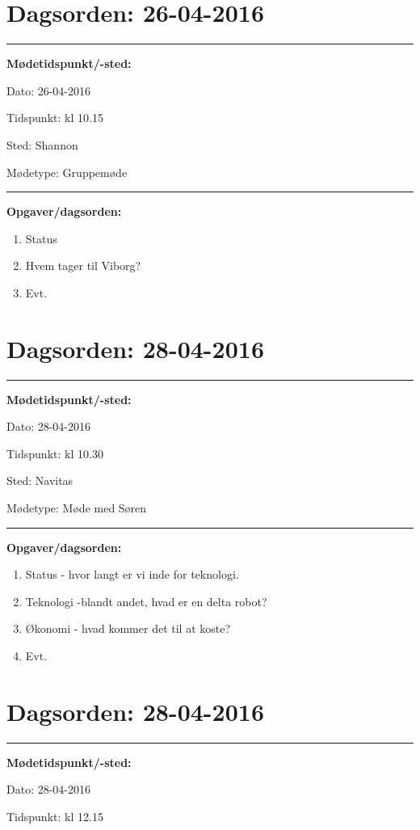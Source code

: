 \section{Dagsorden: 26-04-2016 }
\hrule
\textbf{Mødetidspunkt/-sted:} 

Dato: \tabto{7em} 26-04-2016

Tidspunkt: \tabto{7em} kl 10.15

Sted: \tabto{7em} Shannon 

Mødetype: \tabto{7em} Gruppemøde \newline


\hrule
\textbf{Opgaver/dagsorden:} \newline
\begin{enumerate}
	\item Status
	\item Hvem tager til Viborg? 
	\item Evt. 
\end{enumerate} 

\newpage 
\section{Dagsorden: 28-04-2016 }
\hrule
\textbf{Mødetidspunkt/-sted:} 

Dato: \tabto{7em} 28-04-2016

Tidspunkt: \tabto{7em} kl 10.30

Sted: \tabto{7em} Navitas

Mødetype: \tabto{7em} Møde med Søren \newline


\hrule
\textbf{Opgaver/dagsorden:} \newline
\begin{enumerate}
	\item Status - hvor langt er vi inde for teknologi. 
	\item Teknologi -blandt andet, hvad er en delta robot? 
	\item Økonomi - hvad kommer det til at koste?  
	\item Evt. 
\end{enumerate} 

\section{Dagsorden: 28-04-2016 }
\hrule
\textbf{Mødetidspunkt/-sted:} 

Dato: \tabto{7em} 28-04-2016

Tidspunkt: \tabto{7em} kl 12.15

